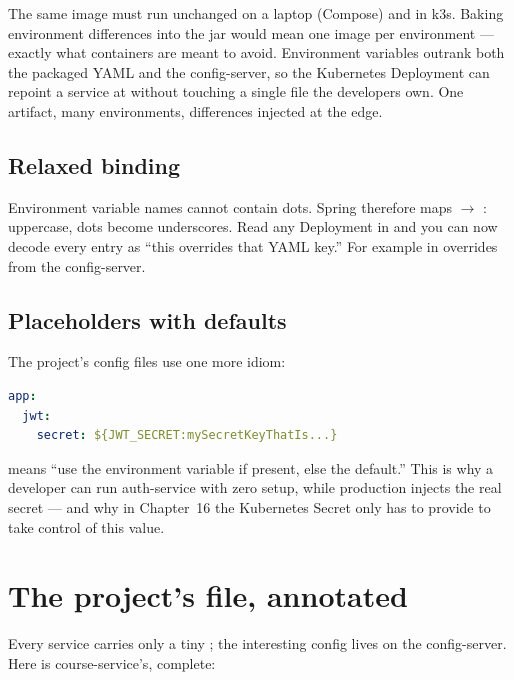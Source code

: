 \begin{decision}
The same image must run unchanged on a laptop (Compose) and in k3s. Baking
environment differences into the jar would mean one image per environment
--- exactly what containers are meant to avoid. Environment variables
outrank both the packaged YAML and the config-server, so the Kubernetes
Deployment can repoint a service at  without
touching a single file the developers own. One artifact, many
environments, differences injected at the edge.
\end{decision}

\subsection{Relaxed binding}

Environment variable names cannot contain dots. Spring therefore maps
 $\rightarrow$ :
uppercase, dots become underscores. Read any Deployment in
 and you can now decode every  entry as
``this overrides that YAML key.'' For example
 in 
overrides  from the config-server.

\subsection{Placeholders with defaults}

The project's config files use one more idiom:

\begin{lstlisting}[language=yaml]
app:
  jwt:
    secret: ${JWT_SECRET:mySecretKeyThatIs...}
\end{lstlisting}

 means ``use the environment variable if present,
else the default.'' This is why a developer can run auth-service with zero
setup, while production injects the real secret --- and why in
Chapter~16 the Kubernetes Secret only has to provide  to
take control of this value.

\section{The project's file, annotated}

Every service carries only a tiny ; the interesting
config lives on the config-server. Here is course-service's, complete:

